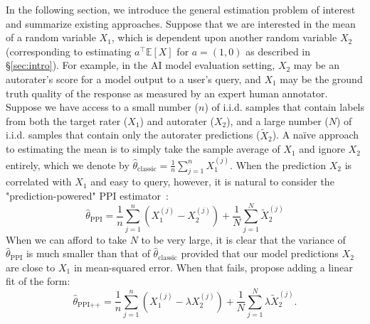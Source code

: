 \documentclass{article} %
\newcommand{\Ex}{\mathbb{E}}
\renewcommand{\cite}{\citep}
\newcommand{\charlie}[1]{ {\color{red}[CCB: #1]}}
\newcommand{\jacob}[1]{ {\color{blue}[JE: #1]}}
\begin{document}
In the following section, we introduce the general estimation problem of interest and summarize existing approaches. Suppose that we are interested in the mean of a random variable $X_1$, which is dependent upon another random variable $X_2$ (corresponding to estimating $a^\top \Ex[X]$ for $a = (1, 0)$ as described in \S\ref{sec:intro}). For example, in the AI model evaluation setting, $X_2$ may be an autorater's score for a model output to a user's query, and $X_1$ may be the ground truth quality of the response as measured by an expert human annotator. Suppose we have access to a small number ($n$) of i.i.d. samples that contain labels from both the target rater ($X_1$) and autorater ($X_2$), and a large number ($N$) of i.i.d. samples that contain only the autorater predictions ($\tilde{X}_2$). A na\"ive approach to estimating the mean is to simply take the sample average of $X_1$ and ignore  $X_2$ entirely, which we denote by $\hat{\theta}_{\text{classic}} = \frac{1}{n}\sum_{j=1}^n X_1^{(j)}$. When the prediction $X_2$ is correlated with $X_1$ and easy to query, however, it is natural to consider the "prediction-powered" PPI estimator~\cite{angelopoulos2023prediction, angelopoulos2023ppi++}:
\begin{equation}
\hat{\theta}_{\text{PPI}} = \frac{1}{n}\sum_{j=1}^n \left(X_1^{(j)}-X_2^{(j)}\right)
+\frac{1}{N}\sum_{j=1}^{N}\tilde{X}_2^{(j)}
\end{equation}
%
When we can afford to take $N$ to be very large, it is clear that the variance of $\hat{\theta}_{\text{PPI}}$ is much smaller than that of $\hat{\theta}_{\text{classic}}$ provided that our model predictions $X_2$ are close to $X_1$ in mean-squared error. When that fails, \citet{angelopoulos2023ppi++} propose adding a linear fit of the form:
%
\begin{equation}\label{eqn:ppi++}
    \hat{\theta}_{\text{PPI{++}}} = \frac{1}{n}\sum_{j=1}^n \left(X_1^{(j)}-\lambda X_2^{(j)}\right) + \frac{1}{N}\sum_{j=1}^N\lambda\tilde{X}_2^{(j)}.
\end{equation}
\end{document}
